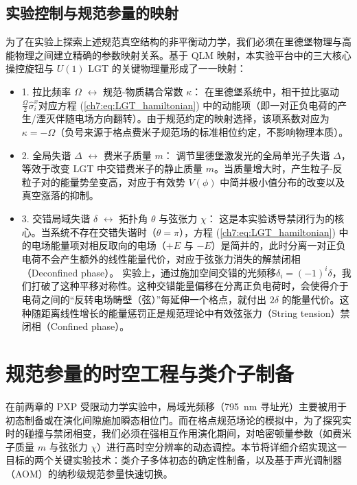 \documentclass[../main.tex]{subfiles}
\begin{document}
\subsection{实验控制与规范参量的映射}

为了在实验上探索上述规范真空结构的非平衡动力学，我们必须在里德堡物理与高能物理之间建立精确的参数映射关系。基于 QLM 映射，本实验平台中的三大核心操控旋钮与 $U(1)$ LGT 的关键物理量形成了一一映射：

\begin{itemize}
    \item 1. 拉比频率 $\Omega$ $\leftrightarrow$ 规范-物质耦合常数 $\kappa$：
   在里德堡系统中，相干拉比驱动$\frac{\Omega}{2}\hat{\sigma}^x_i$对应方程 (\ref{ch7:eq:LGT_hamiltonian}) 中的动能项（即一对正负电荷的产生/湮灭伴随电场方向翻转）。由于规范约定的映射选择，该项系数对应为 $\kappa=-\Omega$（负号来源于格点费米子规范场的标准相位约定，不影响物理本质）。
    \item 2. 全局失谐 $\Delta$ $\leftrightarrow$ 费米子质量 $m$：
   调节里德堡激发光的全局单光子失谐 $\Delta$，等效于改变 LGT 中交错费米子的静止质量 $m$。当质量增大时，产生粒子-反粒子对的能量势垒变高，对应于有效势 $V(\phi)$ 中简并极小值分布的改变以及真空涨落的抑制。
    \item 3. 交错局域失谐 $\delta$ $\leftrightarrow$ 拓扑角 $\theta$ 与弦张力 $\chi$：
   这是本实验诱导禁闭行为的核心。当系统不存在交错失谐时（$\theta=\pi$），方程 (\ref{ch7:eq:LGT_hamiltonian}) 中的电场能量项对相反取向的电场（$+E$ 与 $−E$）是简并的，此时分离一对正负电荷不会产生额外的线性能量代价，对应于弦张力消失的解禁闭相（Deconfined phase）。 实验上，通过施加空间交错的光频移$\delta_i=(-1)^i\delta$，我们打破了这种平移对称性。这种交错能量偏移在分离正负电荷时，会使得介于电荷之间的“反转电场畴壁（弦）”每延伸一个格点，就付出 $2\delta$ 的能量代价。这种随距离线性增长的能量惩罚正是规范理论中有效弦张力（String tension）禁闭相（Confined phase）。
\end{itemize}



\section{规范参量的时空工程与类介子制备}

在前两章的 PXP 受限动力学实验中，局域光频移（\SI{795}{\nm} 寻址光）主要被用于初态制备或在演化间隙施加瞬态相位门。而在格点规范场论的模拟中，为了探究实时的碰撞与禁闭相变，我们必须在强相互作用演化期间，对哈密顿量参数（如费米子质量 $m$ 与弦张力 $\chi$）进行高时空分辨率的动态调控。本节将详细介绍实现这一目标的两个关键实验技术：类介子多体初态的确定性制备，以及基于声光调制器（AOM）的纳秒级规范参量快速切换。
\end{document}
